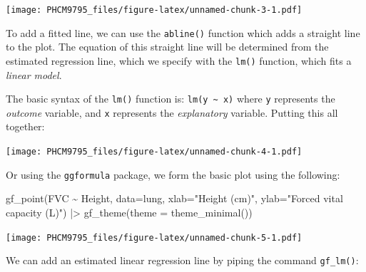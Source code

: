 \documentclass[
]{memoir}
\newenvironment{Shaded}{\begin{snugshade}}{\end{snugshade}}
\newcommand{\AttributeTok}[1]{\textcolor[rgb]{0.77,0.63,0.00}{#1}}
\newcommand{\FunctionTok}[1]{\textcolor[rgb]{0.00,0.00,0.00}{#1}}
\newcommand{\NormalTok}[1]{#1}
\newcommand{\SpecialCharTok}[1]{\textcolor[rgb]{0.00,0.00,0.00}{#1}}
\newcommand{\StringTok}[1]{\textcolor[rgb]{0.31,0.60,0.02}{#1}}
\begin{document}
\texttt{[image: PHCM9795\_files/figure-latex/unnamed-chunk-3-1.pdf]}

To add a fitted line, we can use the \texttt{abline()} function which adds a straight line to the plot. The equation of this straight line will be determined from the estimated regression line, which we specify with the \texttt{lm()} function, which fits a \emph{linear model}.

The basic syntax of the \texttt{lm()} function is: \texttt{lm(y\ \textasciitilde{}\ x)} where \texttt{y} represents the \emph{outcome} variable, and \texttt{x} represents the \emph{explanatory} variable. Putting this all together:

\begin{Shaded}
\end{Shaded}

\texttt{[image: PHCM9795\_files/figure-latex/unnamed-chunk-4-1.pdf]}

Or using the \texttt{ggformula} package, we form the basic plot using the following:

\begin{Shaded}
\begin{Highlighting}[]
\FunctionTok{gf\_point}\NormalTok{(FVC }\SpecialCharTok{\textasciitilde{}}\NormalTok{ Height, }\AttributeTok{data=}\NormalTok{lung,}
     \AttributeTok{xlab=}\StringTok{"Height (cm)"}\NormalTok{, }
     \AttributeTok{ylab=}\StringTok{"Forced vital capacity (L)"}\NormalTok{) }\SpecialCharTok{|\textgreater{}}
  \FunctionTok{gf\_theme}\NormalTok{(}\AttributeTok{theme =} \FunctionTok{theme\_minimal}\NormalTok{())}
\end{Highlighting}
\end{Shaded}

\texttt{[image: PHCM9795\_files/figure-latex/unnamed-chunk-5-1.pdf]}

We can add an estimated linear regression line by piping the command \texttt{gf\_lm()}:
\end{document}
